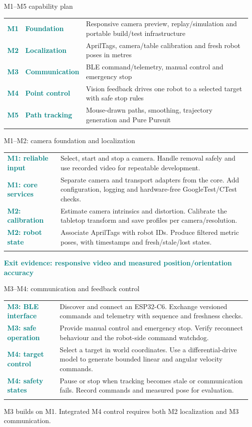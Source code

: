 \documentclass[11pt,aspectratio=169]{beamer}
\newcommand{\planrow}[2]{\textcolor{Teal}{\textbf{#1}} & #2 \\\noalign{\vskip 12pt}}
\newcommand{\milestonerow}[3]{\textcolor{Teal}{\textbf{#1}} & \textcolor{Teal}{\textbf{#2}} & #3 \\\noalign{\vskip 12pt}}
\begin{document}
\begin{frame}{M1--M5 capability plan}
\small
\begin{tabular}{@{}P{0.65cm}P{2.85cm}P{10.0cm}@{}}
\milestonerow{M1}{Foundation}{Responsive camera preview, replay/simulation and portable build/test infrastructure}
\milestonerow{M2}{Localization}{AprilTags, camera/table calibration and fresh robot poses in metres}
\milestonerow{M3}{Communication}{BLE command/telemetry, manual control and emergency stop}
\milestonerow{M4}{Point control}{Vision feedback drives one robot to a selected target with safe stop rules}
\milestonerow{M5}{Path tracking}{Mouse-drawn paths, smoothing, trajectory generation and Pure Pursuit}
\end{tabular}
\end{frame}

\begin{frame}{M1--M2: camera foundation and localization}
\small
\begin{tabular}{@{}P{3.1cm}P{10.7cm}@{}}
\planrow{M1: reliable input}{Select, start and stop a camera. Handle removal safely and use recorded video for repeatable development.}
\planrow{M1: core services}{Separate camera and transport adapters from the core. Add configuration, logging and hardware-free GoogleTest/CTest checks.}
\planrow{M2: calibration}{Estimate camera intrinsics and distortion. Calibrate the tabletop transform and save profiles per camera/resolution.}
\planrow{M2: robot state}{Associate AprilTags with robot IDs. Produce filtered metric poses, with timestamps and fresh/stale/lost states.}
\end{tabular}

\textcolor{Teal}{\textbf{Exit evidence: responsive video and measured position/orientation accuracy}}
\end{frame}

\begin{frame}{M3--M4: communication and feedback control}
\small
\begin{tabular}{@{}P{3.1cm}P{10.7cm}@{}}
\planrow{M3: BLE interface}{Discover and connect an ESP32-C6. Exchange versioned commands and telemetry with sequence and freshness checks.}
\planrow{M3: safe operation}{Provide manual control and emergency stop. Verify reconnect behaviour and the robot-side command watchdog.}
\planrow{M4: target control}{Select a target in world coordinates. Use a differential-drive model to generate bounded linear and angular velocity commands.}
\planrow{M4: safety states}{Pause or stop when tracking becomes stale or communication fails. Record commands and measured pose for evaluation.}
\end{tabular}

\textcolor{Muted}{M3 builds on M1. Integrated M4 control requires both M2 localization and M3 communication.}
\end{frame}
\end{document}
